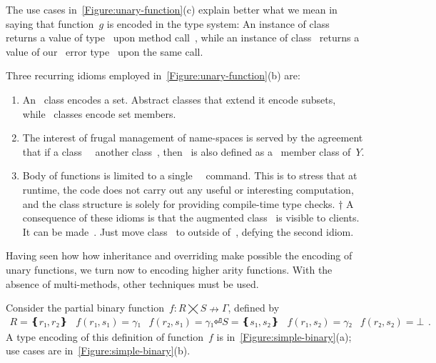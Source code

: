 The use cases in~\cref{Figure:unary-function}(c) explain better
  what we mean in saying that function~$g$ is encoded in the type system:
  An instance of class~ returns a value of type~ upon
  method call~, while
  an instance of class~ returns a value of our~
  error type~ upon the same call.

Three recurring idioms employed in~\cref{Figure:unary-function}(b) are:
\begin{enumerate}
  \item An~ class encodes a set.
    Abstract classes that extend it encode
      subsets, while~ classes encode set members.
  \item The interest of frugal management of name-spaces is served
    by the agreement that if a class~~ another class~, then~ is also defined
    as a~ member class of~$Y$.
  \item Body of functions is limited to a single~~\cc{;} command.
      This is to stress that at runtime, the code does not carry out any useful or interesting computation,
      and the class structure is solely for providing compile-time type checks.
†{%
A consequence of these idioms is that the augmented class~ is visible to clients.
It can be made~. Just move class~ to outside of~, defying the second idiom.
}
\end{enumerate}

Having seen how how inheritance and overriding make possible
  the encoding of unary functions, we turn now to encoding higher arity functions.
With the absence of multi-methods, other techniques must be used.

Consider the partial binary function~$f: R⨉S↛Γ$, defined by
\begin{equation}
  \label{Equation:simple-binary}
  \begin{array}{ccc}
    R=❴r₁,r₂❵ & f(r₁,s₁)=γ₁ & f(r₂,s₁)=γ₁⏎
    S=❴s₁,s₂❵ & f(r₁,s₂)=γ₂ & f(r₂, s₂)=⊥
  \end{array}.
\end{equation}
A \Java type encoding of this definition of function~$f$
  is in~\cref{Figure:simple-binary}(a); use cases
    are in~\cref{Figure:simple-binary}(b).

